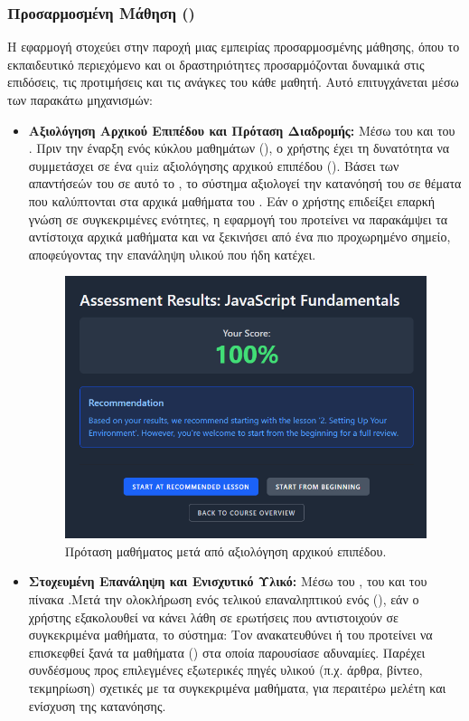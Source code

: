 \subsubsection{Προσαρμοσμένη Μάθηση ()}
\label{sec:adaptive_learning}
Η εφαρμογή στοχεύει στην παροχή μιας εμπειρίας προσαρμοσμένης μάθησης, όπου το εκπαιδευτικό περιεχόμενο και οι δραστηριότητες προσαρμόζονται δυναμικά στις επιδόσεις, τις προτιμήσεις και τις ανάγκες του κάθε μαθητή. Αυτό επιτυγχάνεται μέσω των παρακάτω μηχανισμών:
\begin{itemize}[leftmargin=*, noitemsep]
    \item \textbf{Αξιολόγηση Αρχικού Επιπέδου και Πρόταση Διαδρομής:} Μέσω του  και του . Πριν την έναρξη ενός κύκλου μαθημάτων (), ο χρήστης έχει τη δυνατότητα να συμμετάσχει σε ένα quiz αξιολόγησης αρχικού επιπέδου (). Βάσει των απαντήσεών του σε αυτό το , το σύστημα αξιολογεί την κατανόησή του σε θέματα που καλύπτονται στα αρχικά μαθήματα του . Εάν ο χρήστης επιδείξει επαρκή γνώση σε συγκεκριμένες ενότητες, η εφαρμογή του προτείνει να παρακάμψει τα αντίστοιχα αρχικά μαθήματα και να ξεκινήσει από ένα πιο προχωρημένο σημείο, αποφεύγοντας την επανάληψη υλικού που ήδη κατέχει.
        \begin{figure}[h!]
          \centering
          \includegraphics[scale=0.5]{images/assessment_result.png}
          \caption{Πρόταση μαθήματος μετά από αξιολόγηση αρχικού επιπέδου.}
          \label{fig:pre_course_result_placeholder}
        \end{figure}
    \item \textbf{Στοχευμένη Επανάληψη και Ενισχυτικό Υλικό:} Μέσω του , του  και του πίνακα .Μετά την ολοκλήρωση ενός τελικού επαναληπτικού  ενός  (), εάν ο χρήστης εξακολουθεί να κάνει λάθη σε ερωτήσεις που αντιστοιχούν σε συγκεκριμένα μαθήματα, το σύστημα: Τον ανακατευθύνει ή του προτείνει να επισκεφθεί ξανά τα μαθήματα () στα οποία παρουσίασε αδυναμίες. Παρέχει συνδέσμους προς επιλεγμένες εξωτερικές πηγές υλικού (π.χ. άρθρα, βίντεο, τεκμηρίωση) σχετικές με τα συγκεκριμένα μαθήματα, για περαιτέρω μελέτη και ενίσχυση της κατανόησης.

\end{itemize}
